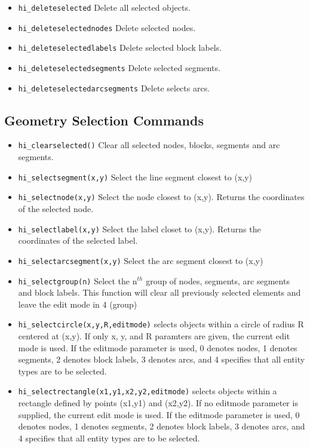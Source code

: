\begin{itemize}
\item {\tt hi\_deleteselected} Delete all selected objects.

\item {\tt hi\_deleteselectednodes} Delete selected nodes.

\item {\tt hi\_deleteselectedlabels} Delete selected block labels.

\item {\tt hi\_deleteselectedsegments} Delete selected segments.

\item {\tt hi\_deleteselectedarcsegments} Delete selects arcs.
\end{itemize}


\subsection{Geometry Selection Commands}

\begin{itemize}
\item {\tt hi\_clearselected()} Clear all selected nodes, blocks, segments and arc
segments.

\item {\tt hi\_selectsegment(x,y)} Select the line segment closest to (x,y)

\item {\tt hi\_selectnode(x,y)} Select the node closest to (x,y).
Returns the coordinates of the selected node.

\item {\tt hi\_selectlabel(x,y)} Select the label closet to (x,y).
Returns the coordinates of the selected label.

\item {\tt hi\_selectarcsegment(x,y)} Select the arc segment closest to (x,y)

\item {\tt hi\_selectgroup(n)} Select the n$^{th}$ group of nodes, segments, arc
segments and block labels. This function will clear all previously selected
elements and leave the edit mode in 4 (group)

\item{\tt hi\_selectcircle(x,y,R,editmode)} selects objects within a circle of radius
R centered at (x,y).  If only x, y, and R paramters are given, the current
edit mode is used.  If the editmode parameter is used, 0 denotes nodes, 1 denotes segments,
2 denotes block labels, 3 denotes arcs, and 4 specifies that all entity types are to be selected.

\item{\tt hi\_selectrectangle(x1,y1,x2,y2,editmode)} selects objects within a rectangle
defined by points (x1,y1) and (x2,y2). If no editmode parameter is supplied,
the current edit mode is used.  If the editmode parameter is used, 0 denotes nodes, 1 denotes segments,
2 denotes block labels, 3 denotes arcs, and 4 specifies that all entity types are to be selected.

\end{itemize}


